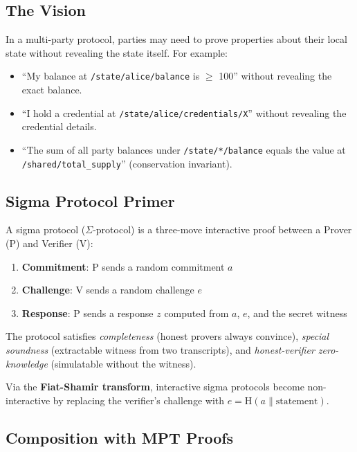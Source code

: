 \documentclass[11pt,a4paper]{article}
\begin{document}
\subsection{The Vision}

In a multi-party protocol, parties may need to prove properties about their
local state without revealing the state itself. For example:

\begin{itemize}[nosep]
  \item ``My balance at \texttt{/state/alice/balance} is $\geq$ 100'' without
    revealing the exact balance.
  \item ``I hold a credential at \texttt{/state/alice/credentials/X}'' without
    revealing the credential details.
  \item ``The sum of all party balances under \texttt{/state/*/balance} equals
    the value at \texttt{/shared/total\_supply}'' (conservation invariant).
\end{itemize}

\subsection{Sigma Protocol Primer}

A sigma protocol ($\Sigma$-protocol) is a three-move interactive proof between
a Prover (P) and Verifier (V):

\begin{enumerate}[nosep]
  \item \textbf{Commitment}: P sends a random commitment $a$
  \item \textbf{Challenge}: V sends a random challenge $e$
  \item \textbf{Response}: P sends a response $z$ computed from $a$, $e$,
    and the secret witness
\end{enumerate}

\noindent The protocol satisfies \emph{completeness} (honest provers always
convince), \emph{special soundness} (extractable witness from two transcripts),
and \emph{honest-verifier zero-knowledge} (simulatable without the witness).

Via the \textbf{Fiat-Shamir transform}, interactive sigma protocols become
non-interactive by replacing the verifier's challenge with
$e = \text{H}(a \| \text{statement})$.

\subsection{Composition with MPT Proofs}
\end{document}
